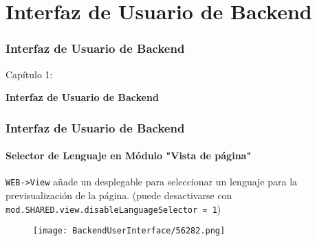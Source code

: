 %

\section{Interfaz de Usuario de Backend}
\begin{frame}[fragile]
	\frametitle{Interfaz de Usuario de Backend}

	\begin{center}\huge{Capítulo 1:}\end{center}
	\begin{center}\huge{\color{typo3darkgrey}\textbf{Interfaz de Usuario de Backend}}\end{center}

\end{frame}

\begin{frame}[fragile]
	\frametitle{Interfaz de Usuario de Backend}
	\framesubtitle{Selector de Lenguaje en Módulo "Vista de página"}


	\texttt{WEB->View} añade un desplegable para seleccionar un lenguaje para la previsualización de la página.\newline
	\smaller
		(puede desactivarse con \texttt{mod.SHARED.view.disableLanguageSelector = 1})
	\normalsize

	\begin{figure}
		\texttt{[image: BackendUserInterface/56282.png]}
	\end{figure}

\end{frame}

